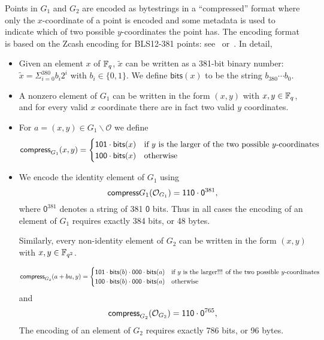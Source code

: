 \label{note:group-compression}
Points in $G_1$ and $G_2$ are encoded as bytestrings in a ``compressed'' format
where only the $x$-coordinate of a point is encoded and some metadata is used to
indicate which of two possible $y$-coordinates the point has.  The encoding
format is based on the Zcash encoding for BLS12-381 points:
see~\cite{Zcash-serialisation} or~\cite[``Serialization'']{blst-library}.  In
detail,
\begin{itemize}

\item Given an element $x$ of $\mathbb{F}_q$, $\tilde{x}$ can be written as a 381-bit
binary number: $\tilde{x} = \Sigma_{i=0}^{380}b_i2^i$ with $b_i \in \{0,1\}$.  We
define $\mathsf{bits}(x)$ to be the string $b_{380}\cdots b_0$.

\item A nonzero element of $G_1$ can be written in the form $(x,y)$ with $x,y\in\mathbb{F}_q$,
and for every valid $x$ coordinate there are in fact two valid $y$ coordinates.

\item For $a = (x,y) \in G_1\backslash \mathcal{O}$ we define
$$
\mathsf{compress}_{G_1} (x,y) = \begin{cases}
\mathsf{1}\mathsf{0}\mathsf{1}\cdot\mathsf{bits}(x) & \text{if $y$ is the larger of the two possible $y$-coordinates}\\
\mathsf{1}\mathsf{0}\mathsf{0}\cdot\mathsf{bits}(x) & \text{otherwise}\\
\end{cases}
$$
\item We encode the identity element of $G_1$ using
$$
\mathsf{compress}{G_1}(\mathcal{O}_{G_1}) = \mathsf{1}\mathsf{1}\mathsf{0}\cdot\mathsf{0}^{381},
$$
\noindent where $\mathsf{0}^{381}$ denotes a string of 381 $\mathsf{0}$ bits.
Thus in all cases the encoding of an element of $G_1$ requires exactly 384 bits,
or 48 bytes.

Similarly, every non-identity element of $G_2$ can be written
in the form $(x,y)$ with $x,y \in \mathbb{F}_{q^2}$.

$$
\mathsf{compress}_{G_2} (a+bu,y) = \begin{cases}
\mathsf{1}\mathsf{0}\mathsf{1}\cdot\mathsf{bits}(b)\cdot\mathsf{0}\mathsf{0}\mathsf{0}\cdot\mathsf{bits}(a)
& \text{if $y$ is the larger!!! of the two possible $y$-coordinates}\\
\mathsf{1}\mathsf{0}\mathsf{0}\cdot\mathsf{bits}(b)\cdot\mathsf{0}\mathsf{0}\mathsf{0}\cdot\mathsf{bits}(a) &
 \text{otherwise}\\
\end{cases}
$$
and
$$
\mathsf{compress}_{G_2}(\mathcal{O}_{G_2}) = \mathsf{1}\mathsf{1}\mathsf{0}\cdot\mathsf{0}^{765},
$$
The encoding of an element of $G_2$ requires exactly 786 bits, or 96 bytes.



\end{itemize}
